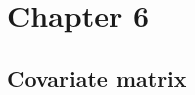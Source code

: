 \documentclass[a4paper, twoside]{templates/ociamthesis}
\begin{document}
~

\hypertarget{appendix-ipd-analysis}{%
\section{Chapter 6}\label{appendix-ipd-analysis}}

\hypertarget{appendix-ipd-covariate-matrix}{%
\subsection{Covariate matrix}\label{appendix-ipd-covariate-matrix}}

~





\begin{table}[H]


\end{table}
\end{document}
